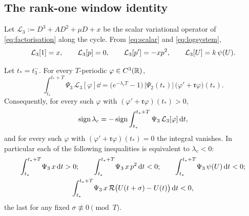 \subsection{The rank-one window identity}
Let $\mathcal L_3:=D^3+AD^2+\mu D+x$ be the scalar variational operator of \eqref{eq:factorisation} along the cycle. From \eqref{eq:scalar} and \eqref{eq:logsystem},
\begin{equation}\label{wk:eq:L3values}
\mathcal L_3[1]=x,\qquad \mathcal L_3[p]=0,\qquad \mathcal L_3[p']=-xp^2,\qquad \mathcal L_3[U]=k\,\psi(U).
\end{equation}
\begin{proposition}\label{prop:rankone}
Let $t_\ast=t_3^-$. For every $T$-periodic $\varphi\in C^3(\mathbb R)$,
\begin{equation}\label{wk:eq:rankone}
\int_{t_\ast}^{t_\ast+T}\Psi_3\,\mathcal L_3[\varphi]\dd
=\bigl(e^{-\lambda_cT}-1\bigr)\,\bigl|\Psi_2(t_\ast)\bigr|\,\bigl(\varphi'+\mathfrak r\varphi\bigr)(t_\ast).
\end{equation}
Consequently, for every such $\varphi$ with $(\varphi'+\mathfrak r\varphi)(t_\ast)>0$,
\[
\operatorname{sign}\lambda_c=-\operatorname{sign}\int_{t_\ast}^{t_\ast+T}\Psi_3\,\mathcal L_3[\varphi]\,\mathrm dt ,
\]
and for every such $\varphi$ with $(\varphi'+\mathfrak r\varphi)(t_\ast)=0$ the integral vanishes. In particular each of the following inequalities is equivalent to $\lambda_c<0$:
\begin{equation}\label{wk:eq:rankinstances}
\begin{gathered}
\int_{t_\ast}^{t_\ast+T}\!\Psi_3\,x\,\mathrm dt>0;\qquad
\int_{t_\ast}^{t_\ast+T}\!\Psi_3\,x\,p^2\,\mathrm dt<0;\qquad
\int_{t_\ast}^{t_\ast+T}\!\Psi_3\,\psi(U)\,\mathrm dt<0;\\
\int_{t_\ast}^{t_\ast+T}\!\Psi_3\,x\,\mathcal R\bigl(U(t+\sigma)-U(t)\bigr)\,\mathrm dt<0 ,
\end{gathered}
\end{equation}
the last for any fixed $\sigma\not\equiv0\pmod T$.
\end{proposition}
